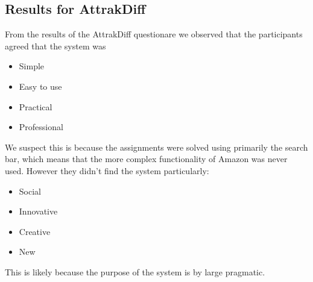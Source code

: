 \subsection{Results for AttrakDiff}
From the results of the AttrakDiff questionare we observed that the participants agreed that the system was
\begin{itemize}
\item Simple
\item Easy to use
\item Practical
\item Professional
\end{itemize}
We suspect this is because the assignments were solved using primarily the search bar, which means that the more complex functionality of Amazon was never used. However they didn't find the system particularly:
\begin{itemize}
\item Social
\item Innovative
\item Creative
\item New
\end{itemize}
This is likely because the purpose of the system is by large pragmatic.
